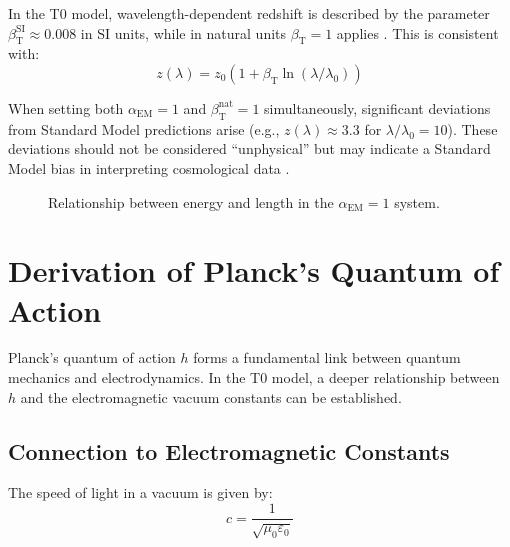 \documentclass[12pt,a4paper]{article}
\newcommand{\betaT}{\beta_{\text{T}}}
\newcommand{\alphaEM}{\alpha_{\text{EM}}}
\begin{document}
	In the T0 model, wavelength-dependent redshift is described by the parameter \(\betaT^{\text{SI}} \approx 0.008\) in SI units, while in natural units \(\betaT = 1\) applies \cite{pascher_params_2025}. This is consistent with:
	\begin{equation}
		z(\lambda) = z_0 (1 + \betaT \ln(\lambda/\lambda_0))
	\end{equation}
	
	When setting both \(\alphaEM = 1\) and \(\betaT^{\text{nat}} = 1\) simultaneously, significant deviations from Standard Model predictions arise (e.g., \(z(\lambda) \approx 3.3\) for \(\lambda/\lambda_0 = 10\)). These deviations should not be considered “unphysical” but may indicate a Standard Model bias in interpreting cosmological data \cite{pascher_alphabeta_2025}.
	
	\begin{figure}[h]
		\centering
		\caption{Relationship between energy and length in the \(\alphaEM = 1\) system.}
	\end{figure}
	
	\section{Derivation of Planck’s Quantum of Action}
	
	Planck’s quantum of action \(h\) forms a fundamental link between quantum mechanics and electrodynamics. In the T0 model, a deeper relationship between \(h\) and the electromagnetic vacuum constants can be established.
	
	\subsection{Connection to Electromagnetic Constants}
	
	The speed of light in a vacuum is given by:
	\begin{equation}
		c = \frac{1}{\sqrt{\mu_0 \varepsilon_0}}
	\end{equation}
	
\end{document}
